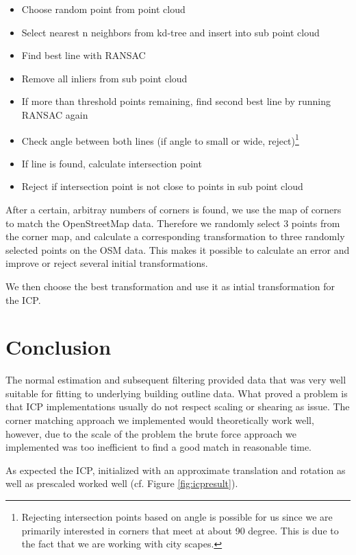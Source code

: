 \documentclass[10pt,twocolumn,letterpaper]{article}
\begin{document}
\begin{itemize}
    \item Choose random point from point cloud
    \item Select nearest n neighbors from kd-tree and insert into sub point cloud
    \item Find best line with RANSAC
    \item Remove all inliers from sub point cloud
    \item If more than threshold points remaining, find second best line by running RANSAC again
    \item Check angle between both lines (if angle to small or wide, reject)\footnote{Rejecting intersection points based on angle is possible for us since we are primarily interested in corners that meet at about 90 degree. This is due to the fact that we are working with city scapes.}
    \item If line is found, calculate intersection point
    \item Reject if intersection point is not close to points in sub point cloud
\end{itemize} 

After a certain, arbitray numbers of corners is found, we use the map of corners to match the OpenStreetMap data. Therefore we randomly select 3 points from the corner map, and calculate a corresponding transformation to three randomly selected points on the OSM data. This makes it possible to calculate an error and improve or reject several initial transformations.

We then choose the best transformation and use it as intial transformation for the ICP.

\section{Conclusion}

The normal estimation and subsequent filtering provided data that was very well suitable for fitting to underlying building outline data. 
What proved a problem is that ICP implementations usually do not respect scaling or shearing as issue. The corner matching approach we implemented would theoretically work well, however, due to the scale of the problem the brute force approach we implemented was too inefficient to find a good match in reasonable time. 

As expected the ICP, initialized with an approximate translation and rotation as well as prescaled worked well (cf. Figure \ref{fig:icpresult}).
\end{document}
